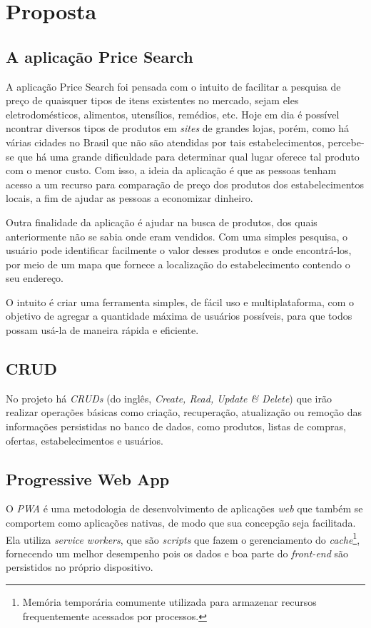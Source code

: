 \section{Proposta}
\label{sec:proposta}

\subsection{A aplicação Price Search}

A aplicação Price Search foi pensada com o intuito de facilitar a pesquisa de preço de quaisquer tipos de itens existentes no mercado, sejam eles eletrodomésticos, alimentos, utensílios, remédios, etc. Hoje em dia é possível ncontrar diversos tipos de produtos em \textit{sites} de grandes lojas, porém, como há várias cidades no Brasil que não são atendidas por tais estabelecimentos, percebe-se que há uma grande dificuldade para determinar qual lugar oferece tal produto com o menor custo. Com isso, a ideia da aplicação é que as pessoas tenham acesso a um recurso para comparação de preço dos produtos dos estabelecimentos locais, a fim de ajudar as pessoas a economizar dinheiro. 

Outra finalidade da aplicação é ajudar na busca de produtos, dos quais anteriormente não se sabia onde eram vendidos. Com uma simples pesquisa, o usuário pode identificar facilmente o valor desses produtos e onde encontrá-los, por meio de um mapa que fornece a localização do estabelecimento contendo o seu endereço. 

O intuito é criar uma ferramenta simples, de fácil uso e multiplataforma, com o objetivo de agregar a quantidade máxima de usuários possíveis, para que todos possam usá-la de maneira rápida e eficiente.

\subsection{CRUD}
No projeto há \textit{CRUDs} (do inglês, \textit{Create, Read, Update \& Delete}) que irão realizar operações básicas como criação, recuperação, atualização ou remoção das informações persistidas no banco de dados, como produtos, listas de compras, ofertas, estabelecimentos e usuários. 

\subsection{Progressive Web App}

O \textit{PWA} é uma metodologia de desenvolvimento de aplicações \textit{web} que também se comportem como aplicações nativas, de modo que sua concepção seja facilitada. Ela utiliza \textit{service workers}, que são \textit{scripts} que fazem o gerenciamento do \textit{cache}\footnote{Memória temporária comumente utilizada para armazenar recursos frequentemente acessados por processos.}, fornecendo um melhor desempenho pois os dados e boa parte do \textit{front-end} são persistidos no próprio dispositivo.

